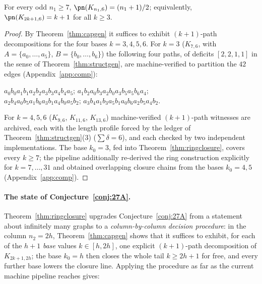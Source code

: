 \begin{corollary}[the $n_2=6$ column]\label{cor:col6}
For every odd $n_1\ge7$, $\pn(K_{n_1,6})=(n_1+1)/2$; equivalently, $\pn(K_{2k+1,6})=k+1$ for
all $k\ge3$.
\end{corollary}

\begin{proof}
By Theorem~\ref{thm:capgen} it suffices to exhibit $(k+1)$-path decompositions for the four
bases $k=3,4,5,6$. For $k=3$ ($K_{7,6}$, with $A=\{a_0,\dots,a_5\}$,
$B=\{b_0,\dots,b_6\}$) the following four paths, of deficits $[2,2,1,1]$ in the sense of
Theorem~\ref{thm:structgen}, are machine-verified to partition the $42$ edges
(Appendix~\ref{app:comp}):
\begin{center}\small
$a_0b_0a_1b_1a_2b_2a_3b_3a_4b_4a_5$;\quad
$a_1b_2a_0b_3a_2b_0a_3b_5a_5b_6a_4$;\\
$a_2b_4a_0b_5a_1b_6a_3b_1a_4b_0a_5b_2$;\quad
$a_3b_4a_1b_3a_5b_1a_0b_6a_2b_5a_4b_2$.
\end{center}
For $k=4,5,6$ ($K_{9,6}$, $K_{11,6}$, $K_{13,6}$) machine-verified $(k+1)$-path witnesses are
archived, each with the length profile forced by the ledger of
Theorem~\ref{thm:structgen}(3) ($\sum\delta=6$), and each checked by two independent
implementations. The base $k_0=3$, fed into Theorem~\ref{thm:ringclosure}, covers every
$k\ge7$; the pipeline additionally re-derived the ring construction explicitly for
$k=7,\dots,31$ and obtained overlapping closure chains from the bases $k_0=4,5$
(Appendix~\ref{app:comp}).
\end{proof}

\paragraph{The state of Conjecture~\ref{conj:27A}.}
Theorem~\ref{thm:ringclosure} upgrades Conjecture~\ref{conj:27A} from a statement about
infinitely many graphs to a \emph{column-by-column decision procedure}: in the column
$n_2=2h$, Theorem~\ref{thm:capgen} shows that it suffices to exhibit, for each of the $h+1$
\emph{base} values $k\in[h,2h]$, one explicit $(k+1)$-path decomposition of $K_{2k+1,2h}$; the
base $k_0=h$ then closes the whole tail $k\ge2h+1$ for free, and every further base lowers the
closure line. Applying the procedure as far as the current machine pipeline reaches gives:

